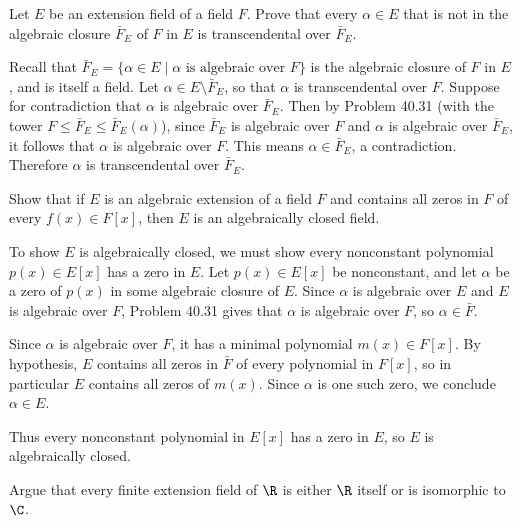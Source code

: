 \begin{problem}[40.32]
  Let $E$ be an extension field of a field $F$. Prove that every $\alpha \in E$ that is not in the algebraic closure $\bar{F}_E$ of $F$ in $E$ is transcendental over $\bar{F}_E$.
\end{problem}

\begin{solution}
  Recall that $\bar{F}_E = \{\alpha \in E \mid \alpha \text{ is algebraic over } F\}$ is the algebraic closure of $F$ in $E$, and is itself a field. Let $\alpha \in E \setminus \bar{F}_E$, so that $\alpha$ is transcendental over $F$. Suppose for contradiction that $\alpha$ is algebraic over $\bar{F}_E$. Then by Problem 40.31 (with the tower $F \le \bar{F}_E \le \bar{F}_E(\alpha)$), since $\bar{F}_E$ is algebraic over $F$ and $\alpha$ is algebraic over $\bar{F}_E$, it follows that $\alpha$ is algebraic over $F$. This means $\alpha \in \bar{F}_E$, a contradiction. Therefore $\alpha$ is transcendental over $\bar{F}_E$.
\end{solution}

\begin{problem}[40.34]
  Show that if $E$ is an algebraic extension of a field $F$ and contains all zeros in $F$ of every $f(x) \in F[x]$, then $E$ is an algebraically closed field.
\end{problem}

\begin{solution}
  To show $E$ is algebraically closed, we must show every nonconstant polynomial $p(x) \in E[x]$ has a zero in $E$. Let $p(x) \in E[x]$ be nonconstant, and let $\alpha$ be a zero of $p(x)$ in some algebraic closure of $E$. Since $\alpha$ is algebraic over $E$ and $E$ is algebraic over $F$, Problem 40.31 gives that $\alpha$ is algebraic over $F$, so $\alpha \in \bar{F}$.

  Since $\alpha$ is algebraic over $F$, it has a minimal polynomial $m(x) \in F[x]$. By hypothesis, $E$ contains all zeros in $\bar{F}$ of every polynomial in $F[x]$, so in particular $E$ contains all zeros of $m(x)$. Since $\alpha$ is one such zero, we conclude $\alpha \in E$.

  Thus every nonconstant polynomial in $E[x]$ has a zero in $E$, so $E$ is algebraically closed.
\end{solution}

\begin{problem}[40.37]
  Argue that every finite extension field of $\R$ is either $\R$ itself or is isomorphic to $\C$.
\end{problem}

